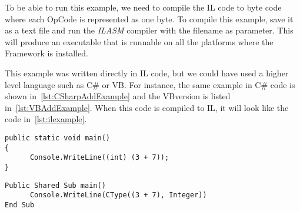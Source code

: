 To be able to run this example, we need to compile the IL code to byte code where each OpCode is represented as one byte.
To compile this example, save it as a text file and run the \emph{ILASM} compiler with the filename as parameter.
This will produce an executable that is runnable on all the platforms where the \dotNET Framework is installed.

This example was written directly in IL code, but we could have used a higher level language such as C\# or VB\dotNET. For instance, the same example in C\# code is shown in~\autoref{lst:CSharpAddExample} and the VB\dotNET version is listed in~\autoref{lst:VBAddExample}. When this code is compiled to IL, it will look like the code in~\autoref{lst:ilexample}.

\begin{lstlisting}[language={[Sharp]C},style=listing,caption={Adding example in the C\# language},label={lst:CSharpAddExample}]
public static void main()
{
      Console.WriteLine((int) (3 + 7));
} 
\end{lstlisting} 

\begin{lstlisting}[language={[Visual]{Basic}},style=listing,caption={Adding example in the VB\dotNET language},label={lst:VBAddExample}]
Public Shared Sub main()
      Console.WriteLine(CType((3 + 7), Integer))
End Sub
\end{lstlisting} 

 
